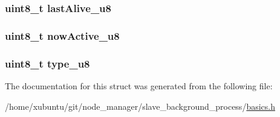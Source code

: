\subsubsection[{last\+Alive\+\_\+u8}]{\setlength{\rightskip}{0pt plus 5cm}uint8\+\_\+t last\+Alive\+\_\+u8}\label{structnode__data_a06224df76b4c5912c002b5828a30e0b5}
\hypertarget{structnode__data_aa73920c33d0191354e36d8e8bd73dd97}{}
\subsubsection[{now\+Active\+\_\+u8}]{\setlength{\rightskip}{0pt plus 5cm}uint8\+\_\+t now\+Active\+\_\+u8}\label{structnode__data_aa73920c33d0191354e36d8e8bd73dd97}
\hypertarget{structnode__data_a677fd4351d9bd7671761acae74011cd5}{}
\subsubsection[{type\+\_\+u8}]{\setlength{\rightskip}{0pt plus 5cm}uint8\+\_\+t type\+\_\+u8}\label{structnode__data_a677fd4351d9bd7671761acae74011cd5}


The documentation for this struct was generated from the following file\+:\begin{DoxyCompactItemize}
\item 
/home/xubuntu/git/node\+\_\+manager/slave\+\_\+background\+\_\+process/\hyperlink{basics_8h}{basics.\+h}\end{DoxyCompactItemize}
